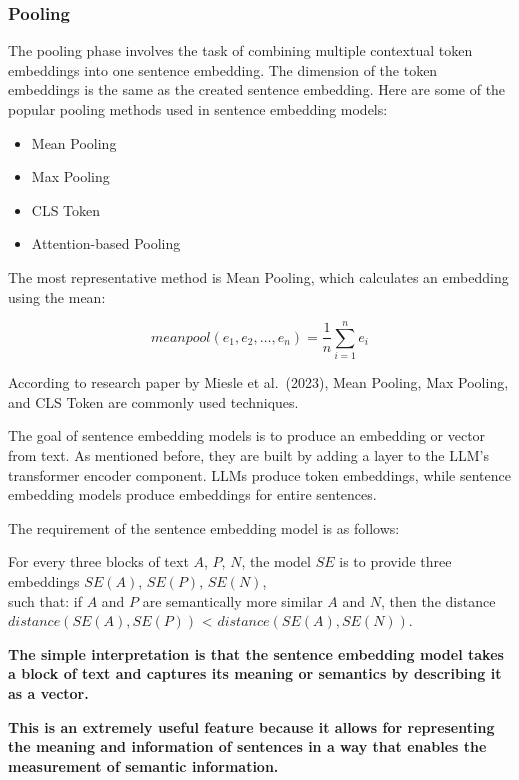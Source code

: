 \documentclass{wseas}
\begin{document}
    \subsubsection{Pooling}

The pooling phase involves the task of combining multiple contextual
token embeddings into one sentence embedding. The dimension of the token
embeddings is the same as the created sentence embedding. Here are some
of the popular pooling methods used in sentence embedding models:

\begin{itemize}
\item
  Mean Pooling
\item
  Max Pooling
\item
  CLS Token
\item
  Attention-based Pooling
\end{itemize}

The most representative method is Mean Pooling, which calculates an
embedding using the mean:

$$
meanpool(e_1, e_2, \ldots, e_n) = \frac{1}{n} \sum_{i=1}^{n} e_i
$$

According to research paper \cite{cite5} by Miesle et al.~(2023), Mean
Pooling, Max Pooling, and CLS Token are commonly used techniques.

The goal of sentence embedding models is to produce an embedding or
vector from text. As mentioned before, they are built by adding a layer
to the LLM's transformer encoder component. LLMs produce token
embeddings, while sentence embedding models produce embeddings for
entire sentences.

The requirement of the sentence embedding model is as follows:

For every three blocks of text \(A\), \(P\), \(N\), the model \(SE\) is
to provide three embeddings \(SE(A)\), \(SE(P)\), \(SE(N)\),\\
such that: if \(A\) and \(P\) are semantically more similar \(A\) and
\(N\), then the distance \(distance(SE(A), SE(P))\) \textless{}
\(distance(SE(A), SE(N))\).

\textbf{The simple interpretation is that the sentence embedding model
takes a block of text and captures its meaning or semantics by
describing it as a vector.}

\textbf{This is an extremely useful feature because it allows for
representing the meaning and information of sentences in a way that
enables the measurement of semantic information.}
\end{document}
